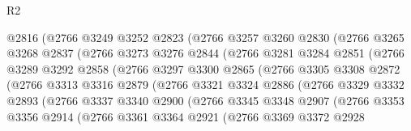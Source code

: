 \begin{lexlean}{R2}
\begin{coremodule}
                  @2816
                  (@2766
                    @3249
                    @3252
                    @2823
                    (@2766
                      @3257
                      @3260
                      @2830
                      (@2766
                        @3265
                        @3268
                        @2837
                        (@2766
                          @3273
                          @3276
                          @2844
                          (@2766
                            @3281
                            @3284
                            @2851
                            (@2766
                              @3289
                              @3292
                              @2858
                              (@2766
                                @3297
                                @3300
                                @2865
                                (@2766
                                  @3305
                                  @3308
                                  @2872
                                  (@2766
                                    @3313
                                    @3316
                                    @2879
                                    (@2766
                                      @3321
                                      @3324
                                      @2886
                                      (@2766
                                        @3329
                                        @3332
                                        @2893
                                        (@2766
                                          @3337
                                          @3340
                                          @2900
                                          (@2766
                                            @3345
                                            @3348
                                            @2907
                                            (@2766
                                              @3353
                                              @3356
                                              @2914
                                              (@2766
                                                @3361
                                                @3364
                                                @2921
                                                (@2766
                                                  @3369
                                                  @3372
                                                  @2928

\end{coremodule}
\end{lexlean}

